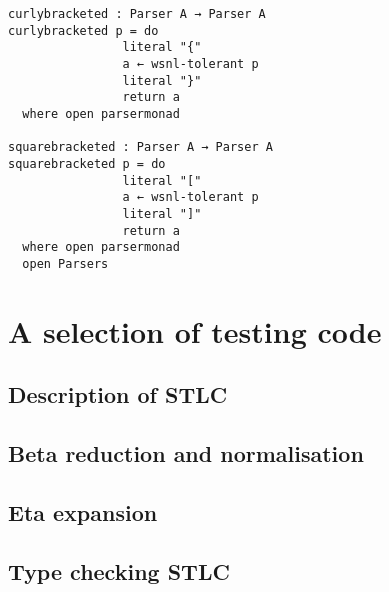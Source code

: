 \begin{appendices}
\begin{verbatim}
curlybracketed : Parser A → Parser A
curlybracketed p = do
                literal "{"
                a ← wsnl-tolerant p
                literal "}"
                return a
  where open parsermonad

squarebracketed : Parser A → Parser A
squarebracketed p = do
                literal "["
                a ← wsnl-tolerant p
                literal "]"
                return a
  where open parsermonad
  open Parsers
\end{verbatim}

\section{A selection of testing code}
\label{appendix-tests}

\subsection{Description of STLC}


\subsection{Beta reduction and normalisation}


\subsection{Eta expansion}


\subsection{Type checking STLC}


\end{appendices}
